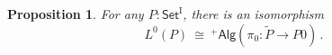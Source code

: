 \documentclass[12pt]{article}
\newcommand{\Set}{\ensuremath{\mathsf{Set}}}
\newcommand{\plusalg}[1]{\ensuremath{^+\!\mathsf{Alg}{(#1)}}}
\newcommand{\plusalgx}{\ensuremath{^+\!\mathsf{Alg}}}
\newcommand{\mono}{\ensuremath{\rightarrowtail}}
\newcommand{\ra}{\ensuremath{\rightarrow}}
\newcommand{\I}{\ensuremath{\mathrm{I}}}
\newtheorem{proposition}[theorem]{Proposition}
\theoremstyle{remark}
\theoremstyle{definition}
\begin{document}
\begin{proposition}
For any $ P : \Set^\I$, there is an isomorphism
\[
L^0(P)\ \cong\ \plusalg{\pi_0 : \widetilde{P} \ra P0}\,.
\]
\end{proposition}
%
\end{document}
